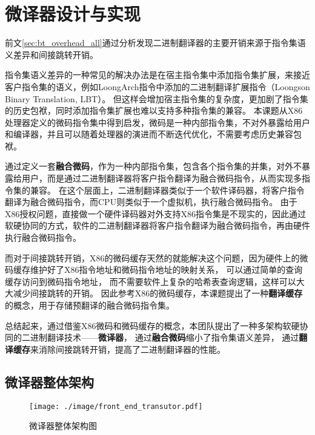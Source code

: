 \chapter{微译器设计与实现}\label{chap:MUT}

前文\ref{sec:bt_overhead_all}通过分析发现二进制翻译器的主要开销来源于指令集语义差异和间接跳转开销。

指令集语义差异的一种常见的解决办法是在宿主指令集中添加指令集扩展，来接近客户指令集的语义，例如LoongArch指令中添加的二进制翻译扩展指令（Loongson Binary Translation, LBT）\cite{LoongArch2023}。
但这样会增加宿主指令集的复杂度，更加剧了指令集的历史包袱，同时添加指令集扩展也难以支持多种指令集的兼容。
本课题从X86处理器定义的微码指令集中得到启发，微码是一种内部指令集，不对外暴露给用户和编译器，并且可以随着处理器的演进而不断迭代优化，不需要考虑历史兼容包袱。

通过定义一套\textbf{融合微码}，作为一种内部指令集，包含各个指令集的并集，对外不暴露给用户，而是通过二进制翻译器将客户指令翻译为融合微码指令，从而实现多指令集的兼容。
在这个层面上，二进制翻译器类似于一个软件译码器，将客户指令翻译为融合微码指令，而CPU则类似于一个虚拟机，执行融合微码指令。
由于X86授权问题，直接做一个硬件译码器对外支持X86指令集是不现实的，因此通过软硬协同的方式，软件的二进制翻译器将客户指令翻译为融合微码指令，再由硬件执行融合微码指令。

而对于间接跳转开销，X86的微码缓存天然的就能解决这个问题，因为硬件上的微码缓存维护好了X86指令地址和微码指令地址的映射关系，
可以通过简单的查询缓存访问到微码指令地址，
而不需要软件上复杂的哈希表查询逻辑，这样可以大大减少间接跳转的开销。
因此参考X86的微码缓存，本课题提出了一种\textbf{翻译缓存}的概念，用于存储预翻译的融合微码指令集。

总结起来，通过借鉴X86微码和微码缓存的概念，本团队提出了一种多架构软硬协同的二进制翻译技术——\textbf{微译器}，
通过\textbf{融合微码}缩小了指令集语义差异，
通过\textbf{翻译缓存}来消除间接跳转开销，提高了二进制翻译器的性能。

\section{微译器整体架构}

\begin{figure}[!htbp]
  \centering
  \texttt{[image: ./image/front\_end\_transutor.pdf]}
  \caption{微译器整体架构图}
  \label{img:front_end_transutor}
\end{figure}

